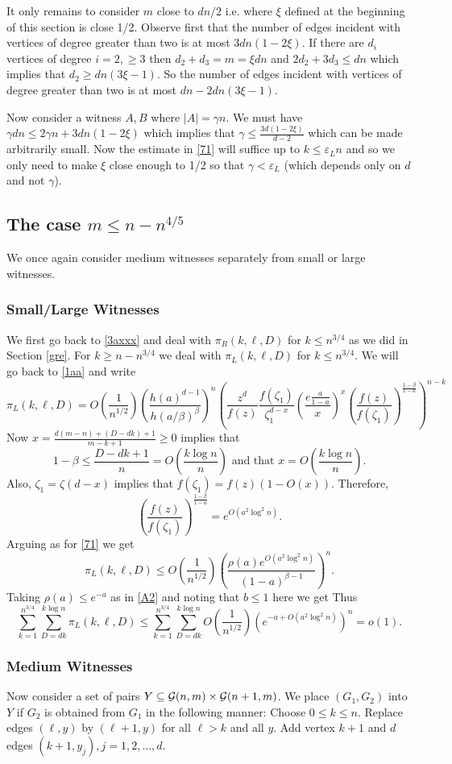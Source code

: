 \documentclass[11pt]{article}
\def\b{\beta}
\def\e{\varepsilon}
\def\g{\gamma}
\def\z{\zeta}
\def\p{\pi}
\def\r{\rho}
\def\cG{{\cal G}}
\newcommand{\brac}[1]{\left(#1\right)}
\newcommand{\bfrac}[2]{\brac{\frac{#1}{#2}}}
\newcommand{\beq}[1]{\begin{equation}\label{#1}}
\newcommand{\eeq}{\end{equation}}
\def\c{{3/4}}
\begin{document}
It only remains to consider $m$ close to $dn/2$ i.e. where $\xi$ defined at the beginning of this section 
is close 1/2. Observe first that the number of edges incident
with vertices of degree greater than two is at most $3dn(1-2\xi)$.
If there are $d_i$ vertices of degree $i=2,\geq3$ then $d_2+d_3=m=\xi dn$ and $2d_2+3d_3\leq dn$ which implies that $d_2\geq dn(3\xi-1)$.
So the number of edges incident with vertices of degree greater than two is at most $dn-2dn(3\xi-1)$.

Now consider a witness $A,B$ where $|A|=\g n$. We must have
$\g dn\leq 2\g n+3dn(1-2\xi)$ which implies that $\g\leq \frac{3d(1-2\xi)}{d-2}$ which can be made arbitrarily small.
Now the estimate in \eqref{71} will suffice up to $k\leq \e_Ln$ and so we only need to make $\xi$ close enough to 1/2 so that
$\g<\e_L$ (which depends only on $d$ and not $\g$). 
\subsection{The case $m\leq n-n^{4/5}$}\label{le}
We once again consider medium witnesses separately from small or large witnesses.
\subsubsection{Small/Large Witnesses}\label{smallww}
We first go back to \eqref{3axxx} and deal with $\p_R(k,\ell,D)$ for $k\leq n^\c$ as we did in Section \ref{gre}. 
For $k\geq n-n^\c$ we deal with $\p_L(k,\ell,D)$ for $k\leq n^\c$. We will go back to \eqref{1aa} and write 
$$\p_L(k,\ell,D)=O\bfrac{1}{n^{1/2}}\bfrac{h(a)^{d-1}}{h(a/\b)^{\b}}^n
\brac{\frac{z^d}{f(z)}\frac{f(\z_1)}{\z_1^{d-x}}
\bfrac{e\frac{a}{1-a}}{x}^x\bfrac{f(z)}{f(\z_1)}^{\frac{1-\b}{1-a}}}^{n-k}$$
Now $x=\frac{d(m-n)+(D-dk)+1}{m-k+1}\geq 0$ implies that 
$$1-\b\leq \frac{D-dk+1}{n}=O\bfrac{k\log n}{n}\text{ and that }x=O\bfrac{k\log n}{n}.$$
Also, $\z_1=\z(d-x)$ implies that $f(\z_1)=f(z)(1-O(x))$. Therefore,
$$\bfrac{f(z)}{f(\z_1)}^{\frac{1-\b}{1-a}}=e^{O(a^2\log^2n)}.$$
Arguing as for \eqref{71} we get
$$\p_L(k,\ell,D)\leq O\bfrac{1}{n^{1/2}}\bfrac{\r(a)e^{O(a^2\log^2n)}}{(1-a)^{\b-1}}^n.$$
Taking $\r(a)\leq e^{-a}$ as in \eqref{A2} and noting that $b\leq 1$ here we get
Thus
\beq{noo7}
\sum_{k=1}^{n^\c}\sum_{D=dk}^{k\log n}\p_L(k,\ell,D)\leq \sum_{k=1}^{n^\c}\sum_{D=dk}^{k\log n}
O\bfrac{1}{n^{1/2}}\brac{e^{-a+O(a^2\log^2n)}}^n=o(1).
\eeq
\subsubsection{Medium Witnesses}
Now consider a set of pairs $Y\subseteq \cG(n,m)\times \cG(n+1,m)$. We place $(G_1,G_2)$ into $Y$ if $G_2$ is obtained from $G_1$
in the following manner:  Choose $0\leq k\leq n$. Replace edges $(\ell,y)$ by $(\ell+1,y)$ for all $\ell>k$ and all $y$.
Add vertex $k+1$ and $d$ edges $(k+1,y_j),j=1,2,\ldots,d$.
\end{document}

